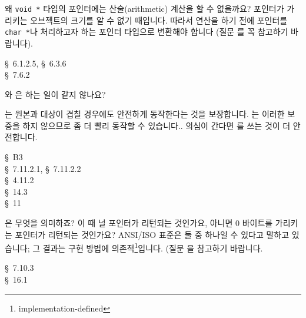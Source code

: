 \begin{faq}
	왜 \verb+void *+ 타입의 포인터에는 산술(arithmetic) 계산을
	할 수 없을까요?
\A
	포인터가 가리키는 오브젝트의 크기를 알 수 없기 때입니다.  따라서
	연산을 하기 전에 포인터를 \verb+char *+나 처리하고자 하는 포인터
	타입으로 변환해야 합니다 (질문 를 꼭 참고하기 바랍니다).

\R
	\cite{c89} \S\ 6.1.2.5, \S\ 6.3.6 \\
        \cite{hs} \S\ 7.6.2 
\end{faq}

\begin{faq}
	와 은 하는 일이 같지 않나요?

\A
	는 원본과 대상이 겹칠 경우에도 안전하게
	동작한다는 것을 보장합니다.  는 이러한 보증을
	하지 않으므로 좀 더 빨리 동작할 수 있습니다..
	의심이 간다면 를 쓰는 것이 더 안전합니다.

\R
	\cite{kr2} \S\ B3  \\
	\cite{c89} \S\ 7.11.2.1, \S\ 7.11.2.2 \\
	\cite{rationale} \S\ 4.11.2 \\
	\cite{hs} \S\ 14.3  \\
	\cite{pcs} \S\ 11 
\end{faq}

\begin{faq}
	은 무엇을 의미하죠? 이 때 널 포인터가 리턴되는
	것인가요, 아니면 0 바이트를 가리키는 포인터가 리턴되는 것인가요?
\A
	ANSI/ISO 표준은 둘 중 하나일 수 있다고 말하고 있습니다; 그 결과는
	구현 방법에 의존적\footnote{implementation-defined}입니다.
	(질문 을 참고하기 바랍니다.

\R
	\cite{c89} \S\ 7.10.3 \\
	\cite{pcs} \S\ 16.1 
\end{faq}

